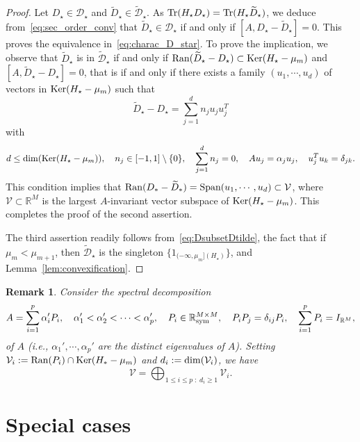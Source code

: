\documentclass{article}
\def\R{\mathbb R}
\newtheorem{remark}[theorem]{Remark}
\newcommand{\tr}{{\rm Tr}}
\newcommand{\1}{{\mathds 1}}
\begin{document}
\begin{proof}
\medskip

Let $D_\star \in \mathcal D_\star$ and $\widetilde D_\star \in \widetilde{\mathcal D}_\star$. As $\tr(H_\star D_\star) = \tr(H_\star \widetilde D_\star)$, we deduce from~\eqref{eq:sec_order_conv} that $\widetilde D_\star \in \mathcal D_\star$ if and only if $[A,D_\star-\widetilde D_\star]=0$. This proves the equivalence in~\eqref{eq:charac_D_star}. To prove the implication, we observe that $\widetilde D_\star$ is in $\widetilde{\mathcal D}_\star$ if and only if ${\rm Ran}(\widetilde D_\star-D_\star) \subset {\rm Ker}(H_\star-\mu_m)$ and $[A,\widetilde D_\star-D_\star]=0$, that is if and only if there exists a family $(u_1,\cdots,u_d)$ of vectors in ${\rm Ker}(H_\star-\mu_m)$ such that
$$
\widetilde D_\star-D_\star = \sum_{j=1}^{d} n_j u_ju_j^T 
$$
with
$$
d \le {\rm dim}({\rm Ker}(H_\star-\mu_m)), \quad n_j \in [-1,1] \setminus \{0\}, \quad \sum_{j=1}^d n_j=0, \quad Au_j= \alpha_j u_j, \quad u_j^Tu_k=\delta_{jk}.
$$
This condition implies that ${\rm Ran}(D_*-\widetilde D_*) = \mbox{Span}(u_1,\cdots,u_d) \subset \mathcal V$, where $\mathcal V \subset \R^M$ is the largest $A$-invariant vector subspace of ${\rm Ker}(H_\star-\mu_m)$. This completes the proof of the second assertion.

\medskip

The third assertion readily follows from~\eqref{eq:DsubsetDtilde}, the fact that if $\mu_m < \mu_{m+1}$, then $\widetilde {\mathcal D}_\star$ is the singleton $\{1_{(-\infty,\mu_m](H_\star)}\}$, and Lemma~\ref{lem:convexification}.
\end{proof}


\medskip

\begin{remark} Consider the spectral decomposition 
$$
A = \sum_{i=1}^p \alpha_i' P_i, \quad \alpha_1' < \alpha_2' < \cdots < \alpha_p', \quad P_i \in \R^{M \times M}_{\rm sym}, \quad P_iP_j=\delta_{ij} P_i, \quad \sum_{i=1}^p P_i = I_{\R^M},
$$
of $A$ (i.e., $\alpha_1', \cdots, \alpha_p'$ are the {\em distinct} eigenvalues of $A$). Setting $\mathcal V_i:={\rm Ran}(P_i) \cap {\rm Ker}(H_*-\mu_m)$ and $d_i:={\rm dim}(\mathcal V_i)$, we have
$$
\mathcal V=\bigoplus_{1 \le i \le p \; : \; d_i \ge 1} \mathcal V_i.
$$
\end{remark}

\section{Special cases}
\label{sec:special}
\end{document}
